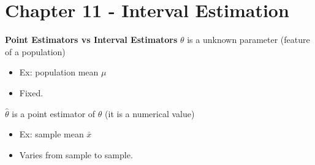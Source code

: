\documentclass[]{article}
\begin{document}
\maketitle

\newpage
\Huge\section{Chapter 11 - Interval Estimation}
\Large\textbf{Point Estimators vs Interval Estimators}
\newline 
\newline $\theta$ is a unknown parameter (feature of a population)
\begin{itemize}
	\item Ex: population mean $\mu$
	\item Fixed.
\end{itemize}
$\hat\theta$ is a point estimator of $\theta$ (it is a numerical value)
\begin{itemize}
	\item Ex: sample mean $\bar{x}$
	\item Varies from sample to sample.
\end{itemize}


 
\section{}
\end{document}
